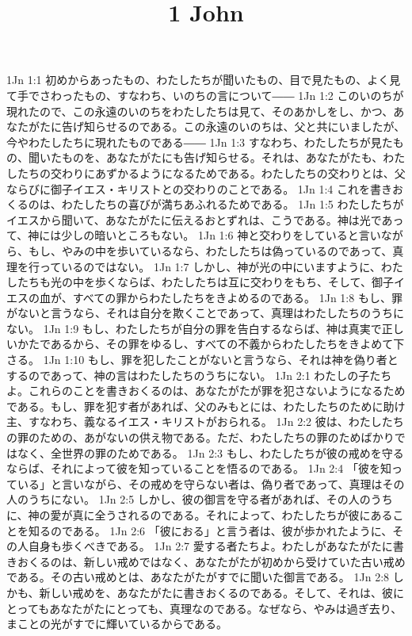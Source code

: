 

\title{1 John}

1Jn 1:1  初めからあったもの、わたしたちが聞いたもの、目で見たもの、よく見て手でさわったもの、すなわち、いのちの言について――
1Jn 1:2  このいのちが現れたので、この永遠のいのちをわたしたちは見て、そのあかしをし、かつ、あなたがたに告げ知らせるのである。この永遠のいのちは、父と共にいましたが、今やわたしたちに現れたものである――
1Jn 1:3  すなわち、わたしたちが見たもの、聞いたものを、あなたがたにも告げ知らせる。それは、あなたがたも、わたしたちの交わりにあずかるようになるためである。わたしたちの交わりとは、父ならびに御子イエス・キリストとの交わりのことである。
1Jn 1:4  これを書きおくるのは、わたしたちの喜びが満ちあふれるためである。
1Jn 1:5  わたしたちがイエスから聞いて、あなたがたに伝えるおとずれは、こうである。神は光であって、神には少しの暗いところもない。
1Jn 1:6  神と交わりをしていると言いながら、もし、やみの中を歩いているなら、わたしたちは偽っているのであって、真理を行っているのではない。
1Jn 1:7  しかし、神が光の中にいますように、わたしたちも光の中を歩くならば、わたしたちは互に交わりをもち、そして、御子イエスの血が、すべての罪からわたしたちをきよめるのである。
1Jn 1:8  もし、罪がないと言うなら、それは自分を欺くことであって、真理はわたしたちのうちにない。
1Jn 1:9  もし、わたしたちが自分の罪を告白するならば、神は真実で正しいかたであるから、その罪をゆるし、すべての不義からわたしたちをきよめて下さる。
1Jn 1:10  もし、罪を犯したことがないと言うなら、それは神を偽り者とするのであって、神の言はわたしたちのうちにない。
1Jn 2:1  わたしの子たちよ。これらのことを書きおくるのは、あなたがたが罪を犯さないようになるためである。もし、罪を犯す者があれば、父のみもとには、わたしたちのために助け主、すなわち、義なるイエス・キリストがおられる。
1Jn 2:2  彼は、わたしたちの罪のための、あがないの供え物である。ただ、わたしたちの罪のためばかりではなく、全世界の罪のためである。
1Jn 2:3  もし、わたしたちが彼の戒めを守るならば、それによって彼を知っていることを悟るのである。
1Jn 2:4  「彼を知っている」と言いながら、その戒めを守らない者は、偽り者であって、真理はその人のうちにない。
1Jn 2:5  しかし、彼の御言を守る者があれば、その人のうちに、神の愛が真に全うされるのである。それによって、わたしたちが彼にあることを知るのである。
1Jn 2:6  「彼におる」と言う者は、彼が歩かれたように、その人自身も歩くべきである。
1Jn 2:7  愛する者たちよ。わたしがあなたがたに書きおくるのは、新しい戒めではなく、あなたがたが初めから受けていた古い戒めである。その古い戒めとは、あなたがたがすでに聞いた御言である。
1Jn 2:8  しかも、新しい戒めを、あなたがたに書きおくるのである。そして、それは、彼にとってもあなたがたにとっても、真理なのである。なぜなら、やみは過ぎ去り、まことの光がすでに輝いているからである。
